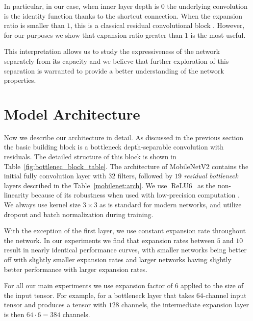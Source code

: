 \documentclass[10pt,twocolumn,letterpaper]{article}
\def\relus{{\ensuremath{\operatorname{\mathop{ReLU6}\,}}}}
\begin{document}
In particular, in our case, when inner layer depth is $0$ the underlying convolution is the identity function thanks to the shortcut connection.
When the expansion ratio is smaller than $1$, this is a classical residual convolutional block \cite{ResNet,ResNext2016}.
However, for our purposes we show that expansion ratio greater than $1$ is the most useful.

This interpretation allows us to study the expressiveness of the network separately from its capacity and we believe that further exploration of this separation is warranted to provide a better understanding of the network properties.


\section{Model Architecture}

Now we describe our architecture in detail. As discussed in the previous section the
basic building block is a bottleneck depth-separable convolution with residuals.
The detailed structure
of this block is shown in Table~\ref{fig:bottlenec_block_table}. The architecture of \mbox{MobileNetV2} contains the initial fully convolution layer with $32$ filters, followed by $19$ {\em residual bottleneck} layers described in the Table~\ref{mobilenet:arch}. We use $\relus$ as the non-linearity because of its robustness when used with low-precision computation \cite{MobilenetV1}. We always use kernel size $3\times 3$ as is standard for modern networks, and utilize dropout and batch normalization during training. 

With the exception of the first layer, we use constant expansion rate throughout the network. In our experiments we find that expansion rates between $5$ and $10$ result in nearly identical performance curves, with smaller networks being better off with slightly smaller expansion rates and larger networks having slightly better performance with larger expansion rates.

For all our main experiments we use expansion factor of $6$ applied to the size of the input tensor. For example, for a bottleneck layer that takes $64$-channel input tensor and produces a tensor with $128$ channels, the intermediate expansion layer is then $64 \cdot 6 = 384$ channels.
\end{document}
